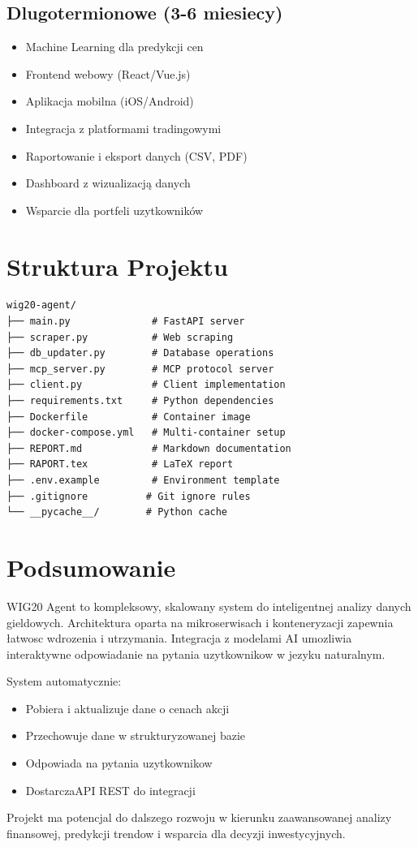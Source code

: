 \documentclass[11pt,a4paper]{article}
\begin{document}
\subsection{Dlugotermionowe (3-6 miesiecy)}

\begin{itemize}
    \item Machine Learning dla predykcji cen
    \item Frontend webowy (React/Vue.js)
    \item Aplikacja mobilna (iOS/Android)
    \item Integracja z platformami tradingowymi
    \item Raportowanie i eksport danych (CSV, PDF)
    \item Dashboard z wizualizacją danych
    \item Wsparcie dla portfeli uzytkowników
\end{itemize}

\section{Struktura Projektu}

\begin{verbatim}
wig20-agent/
├── main.py              # FastAPI server
├── scraper.py           # Web scraping
├── db_updater.py        # Database operations
├── mcp_server.py        # MCP protocol server
├── client.py            # Client implementation
├── requirements.txt     # Python dependencies
├── Dockerfile           # Container image
├── docker-compose.yml   # Multi-container setup
├── REPORT.md            # Markdown documentation
├── RAPORT.tex           # LaTeX report
├── .env.example         # Environment template
├── .gitignore          # Git ignore rules
└── __pycache__/        # Python cache
\end{verbatim}

\section{Podsumowanie}

WIG20 Agent to kompleksowy, skalowany system do inteligentnej analizy danych gieldowych. Architektura oparta na mikroserwisach i konteneryzacji zapewnia łatwosc wdrozenia i utrzymania. Integracja z modelami AI umozliwia interaktywne odpowiadanie na pytania uzytkownikow w jezyku naturalnym.

System automatycznie:
\begin{itemize}
    \item Pobiera i aktualizuje dane o cenach akcji
    \item Przechowuje dane w strukturyzowanej bazie
    \item Odpowiada na pytania uzytkownikow
    \item DostarczaAPI REST do integracji
\end{itemize}

Projekt ma potencjal do dalszego rozwoju w kierunku zaawansowanej analizy finansowej, predykcji trendow i wsparcia dla decyzji inwestycyjnych.
\end{document}

